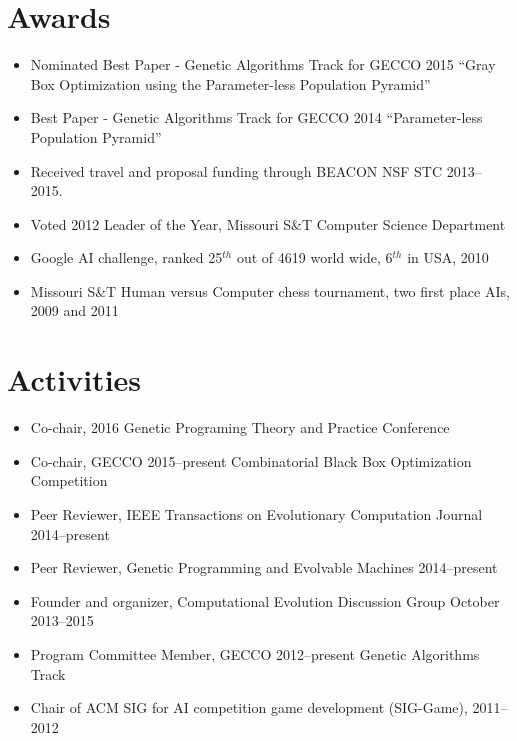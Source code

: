 \documentclass[a4paper,11pt]{article}
\begin{document}
\section{Awards}
\begin{itemize}
\item     Nominated Best Paper - Genetic Algorithms Track for GECCO 2015 ``Gray Box Optimization using the Parameter-less Population Pyramid''
\item     Best Paper - Genetic Algorithms Track for GECCO 2014 ``Parameter-less Population Pyramid''
\item     Received travel and proposal funding through BEACON NSF STC 2013--2015.
\item     Voted 2012 Leader of the Year, Missouri S\&T Computer Science Department
\item     Google AI challenge, ranked 25$^{th}$ out of 4619 world wide, 6$^{th}$ in USA, 2010
\item     Missouri S\&T Human versus Computer chess tournament, two first place AIs, 2009 and 2011
\end{itemize}

\section{Activities}
\begin{itemize}
\item     Co-chair, 2016 Genetic Programing Theory and Practice Conference
\item     Co-chair, GECCO 2015--present Combinatorial Black Box Optimization Competition
\item     Peer Reviewer, IEEE Transactions on Evolutionary Computation Journal 2014--present
\item     Peer Reviewer, Genetic Programming and Evolvable Machines 2014--present
\item     Founder and organizer, Computational Evolution Discussion Group October 2013--2015
\item     Program Committee Member, GECCO 2012--present Genetic Algorithms Track
\item     Chair of ACM SIG for AI competition game development (SIG-Game), 2011--2012
\end{itemize}
\end{document}
